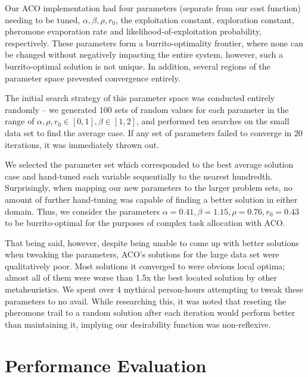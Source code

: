 \documentclass[a4paper]{article}
\begin{document}
Our ACO implementation had four parameters (separate from our cost function) needing to be tuned, $\alpha, \beta, \rho, r_0$, the exploitation constant, exploration constant, pheromone evaporation rate and likelihood-of-exploitation probability, respectively. These parameters form a burrito-optimality frontier, where none can be changed without negatively impacting the entire system, however, such a burrito-optimal solution is not unique. In addition, several regions of the parameter space prevented convergence entirely.

The initial search strategy of this parameter space was conducted entirely randomly -- we generated 100 sets of random values for each parameter in the range of $\alpha, \rho, r_0 \in [0, 1], \beta \in [1, 2]$, and performed ten searches on the small data set to find the average case. If any set of parameters failed to converge in 20 iterations, it was immediately thrown out.

We selected the parameter set which corresponded to the best average solution case and hand-tuned each variable sequentially to the nearest hundredth. Surprisingly, when mapping our new parameters to the larger problem sets, no amount of further hand-tuning was capable of finding a better solution in either domain. Thus, we consider the parameters $\alpha = 0.41, \beta = 1.15, \rho = 0.76, r_0 = 0.43$ to be burrito-optimal for the purposes of complex task allocation with ACO.

That being said, however, despite being unable to come up with better solutions when tweaking the parameters, ACO's solutions for the large data set were qualitatively poor. Most solutions it converged to were obvious local optima; almost all of them were worse than 1.5x the best located solution by other metaheuristics. We spent over 4 mythical person-hours attempting to tweak these parameters to no avail. While researching this, it was noted that reseting the pheromone trail to a random solution after each iteration would perform better than maintaining it, implying our desirability function was non-reflexive.


\section{Performance Evaluation}

\end{document}
